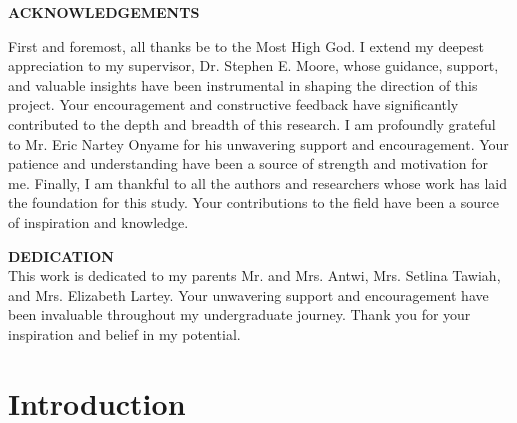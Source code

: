 \documentclass{book}
\numberwithin{equation}{section}
\numberwithin{figure}{section}
\begin{document}
\newpage
{}%
\begin{center}
\textbf{ACKNOWLEDGEMENTS}
\end{center}
\begin{doublespacing}
 First and foremost, all thanks be to the Most High God. I extend my deepest appreciation to my supervisor, Dr. Stephen E. Moore, whose guidance, support, and valuable insights have been instrumental in shaping the direction of this project. Your encouragement and constructive feedback have significantly contributed to the depth and breadth of this research. I am profoundly grateful to Mr. Eric Nartey Onyame for his unwavering support and encouragement. Your patience and understanding have been a source of strength and motivation for me. Finally, I am thankful to all the authors and researchers whose work has laid the foundation for this study. Your contributions to the field have been a source of inspiration and knowledge.

\end{doublespacing}
\newpage
{}%
\begin{center}
 \textbf{DEDICATION}\\
 This work is dedicated to my parents Mr. and Mrs. Antwi, Mrs. Setlina Tawiah, and Mrs. Elizabeth Lartey. Your unwavering support and encouragement have been invaluable throughout my undergraduate journey. Thank you for your inspiration and belief in my potential.
\end{center}
\begin{doublespacing}
  
\end{doublespacing}


\newpage
\clearpage
\tableofcontents
\newpage
\listoffigures
\newpage
\listoftables

\newpage
{}
\newpage
{}
\vspace{-5mm} %
\chapter{Introduction}
\end{document}
